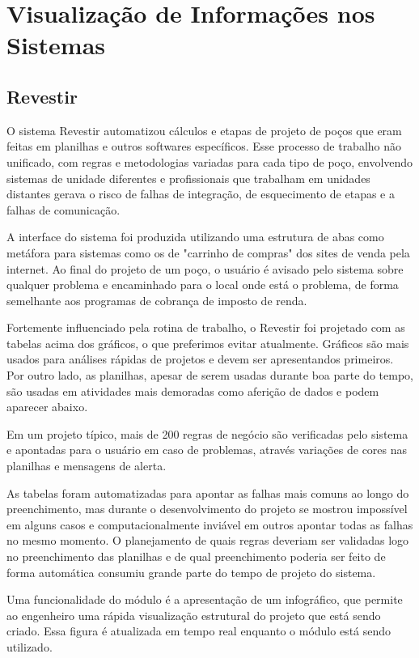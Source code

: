 \documentclass[]{article}
\begin{document}
\section{Visualização de Informações nos Sistemas} 

\subsection{Revestir}

O sistema Revestir automatizou cálculos e etapas de projeto de poços que eram feitas em planilhas e outros softwares específicos. Esse processo de trabalho não unificado, com regras e metodologias variadas para cada tipo de poço, envolvendo sistemas de unidade diferentes e profissionais que trabalham em unidades distantes gerava o risco de falhas de integração, de esquecimento de etapas e a falhas de comunicação. 

A interface do sistema foi produzida utilizando uma estrutura de abas como metáfora para sistemas como os de "carrinho de compras" dos sites de venda pela internet. Ao final do projeto de um poço, o usuário é avisado pelo sistema sobre qualquer problema e encaminhado para o local onde está o problema, de forma semelhante aos programas de cobrança de imposto de renda.

Fortemente influenciado pela rotina de trabalho, o Revestir foi projetado com as tabelas acima dos gráficos, o que preferimos evitar atualmente. Gráficos são mais usados para análises rápidas de projetos e devem ser apresentandos primeiros. Por outro lado, as planilhas, apesar de serem usadas durante boa parte do tempo, são usadas em atividades mais demoradas como aferição de dados e podem aparecer abaixo. 

Em um projeto típico, mais de 200 regras de negócio são verificadas pelo sistema e apontadas para o usuário em caso de problemas, através variações de cores nas planilhas e mensagens de alerta.

As tabelas foram automatizadas para apontar as falhas mais comuns ao longo do preenchimento, mas durante o desenvolvimento do projeto se mostrou impossível em alguns casos e computacionalmente inviável em outros apontar todas as falhas no mesmo momento. O planejamento de quais regras deveriam ser validadas logo no preenchimento das planilhas e de qual preenchimento poderia ser feito de forma automática consumiu grande parte do tempo de projeto do sistema.

Uma funcionalidade do módulo é a apresentação de um infográfico, que permite ao engenheiro uma rápida visualização estrutural do projeto que está sendo criado. Essa figura é atualizada em tempo real enquanto o módulo está sendo utilizado.
\end{document}
